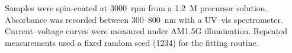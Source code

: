 Samples were spin-coated at 3000~rpm from a 1.2~M precursor solution.
Absorbance was recorded between 300--800~nm with a UV--vis spectrometer.
Current--voltage curves were measured under AM1.5G illumination.
Repeated measurements used a fixed random seed (1234) for the fitting routine.
